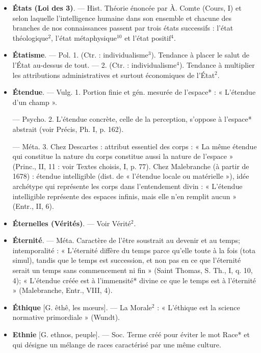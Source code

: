\begin{itemize}[leftmargin=1cm, label=, itemsep=1pt]
\item {\bf États (Loi des 3)}. — Hist. Théorie
énoncée par À. Comte (Cours, I) et
selon laquelle l'intelligence humaine
dans son ensemble et chacune des
branches de nos connaissances passent par trois états successifs : l’état
théologique$^2$, l'état métaphysique$^{10}$
et l'état positif$^4$.

\item {\bf Étatisme}. — Pol. 1. (Ctr. : individualisme$^3$). Tendance à placer le salut
de l'État au-dessus de tout. — 2.
(Ctr. : individualisme$^4$). Tendance à
multiplier les attributions administratives et surtout économiques de
l'État$^2$.

\item {\bf Étendue}. — Vulg. 1. Portion finie et
gén. mesurée de l’espace* : « L’étendue d’un champ ».

— Psycho. 2. L'étendue concrète,
celle de la perception, s'oppose à
l’espace* abstrait (voir Précis, Ph. I,
p. 162).

— Méta. 3. Chez Descartes :
attribut essentiel des corps : « La
même étendue qui constitue la nature du corps constitue aussi la
nature de l’espace » (Princ., II, 11 :
voir Textes choisis, I, p. 77). Chez
Malebranche (à partir de 1678) :
étendue intelligible (dist. de « l’étendue locale ou matérielle »), idée
archétype qui représente les corps
dans l’entendement divin : « L’étendue intelligible représente des espaces infinis, mais elle n’en remplit
aucun » (Entr., II, 6).

\item {\bf Éternelles (Vérités)}. — Voir Vérité$^2$.

\item {\bf Éternité}. — Méta. Caractère de l'être
soustrait au devenir et au temps;
intemporalité : « L'éternité diffère
du temps parce qu’elle toute à la
fois (tota simul), tandis que le temps
est succession, et non pas en ce que
l’éternité serait un temps sans commencement ni fin » (Saint Thomas,
S. Th., I, q. 10, 4); « L’étendue créée
est à l’immensité* divine ce que le
temps est à l'éternité » (Malebranche, Entr., VIII, 4).

\item {\bf Éthique} [G. êthê, les mœurs]. — La
Morale$^2$ : « L’éthique est la science
normative primordiale » (Wundt).

\item {\bf Ethnie} [G. ethnos, peuple]. — Soc.
Terme créé pour éviter le mot Race*
et qui désigne un mélange de races
caractérisé par une même culture.


\end{itemize}
